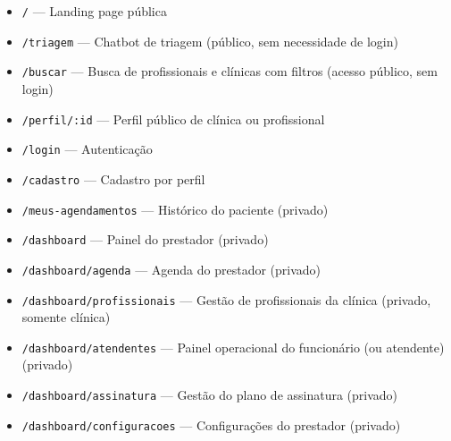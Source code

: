 \begin{itemize}
  \item \texttt{/} --- Landing page pública
  \item \texttt{/triagem} --- Chatbot de triagem
        (público, sem necessidade de login)
  \item \texttt{/buscar} --- Busca de profissionais
        e clínicas com filtros
        (acesso público, sem login)
  \item \texttt{/perfil/:id} --- Perfil público de
        clínica ou profissional
  \item \texttt{/login} --- Autenticação
  \item \texttt{/cadastro} --- Cadastro por perfil
  \item \texttt{/meus-agendamentos} --- Histórico
        do paciente (privado)
  \item \texttt{/dashboard} --- Painel do prestador
        (privado)
  \item \texttt{/dashboard/agenda} --- Agenda do
        prestador (privado)
  \item \texttt{/dashboard/profissionais} --- Gestão
        de profissionais da clínica (privado,
        somente clínica)
  \item \texttt{/dashboard/atendentes} --- Painel
        operacional do funcionário (ou atendente)
        (privado)
  \item \texttt{/dashboard/assinatura} --- Gestão
        do plano de assinatura (privado)
  \item \texttt{/dashboard/configuracoes} ---
        Configurações do prestador (privado)
\end{itemize}